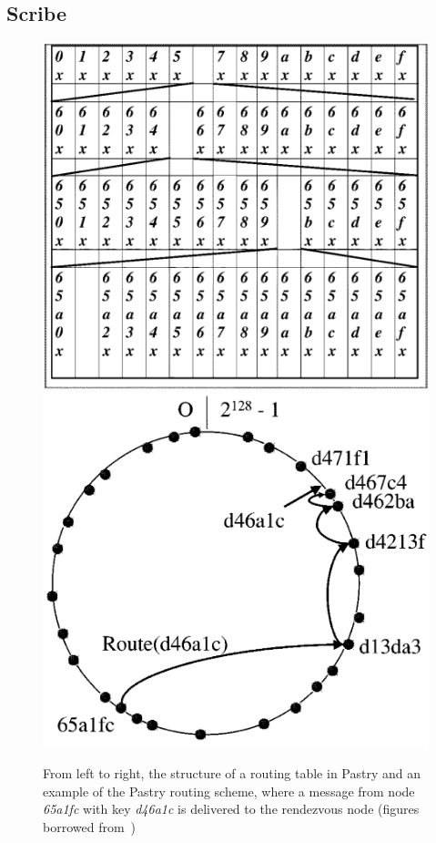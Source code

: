 \subsection{Scribe}

\begin{figure}
    \includegraphics[scale=0.19]{img/pastry_table.png}
    \includegraphics[scale=0.19]{img/pastry_routing.png}
    \caption{From
        left to right, the structure of a routing table in Pastry and an
        example of the Pastry routing scheme, where a message from node
        \emph{65a1fc} with key \emph{d46a1c} is delivered to the rendezvous
        node (figures borrowed from~\cite{Castro:2002})}
\end{figure}

